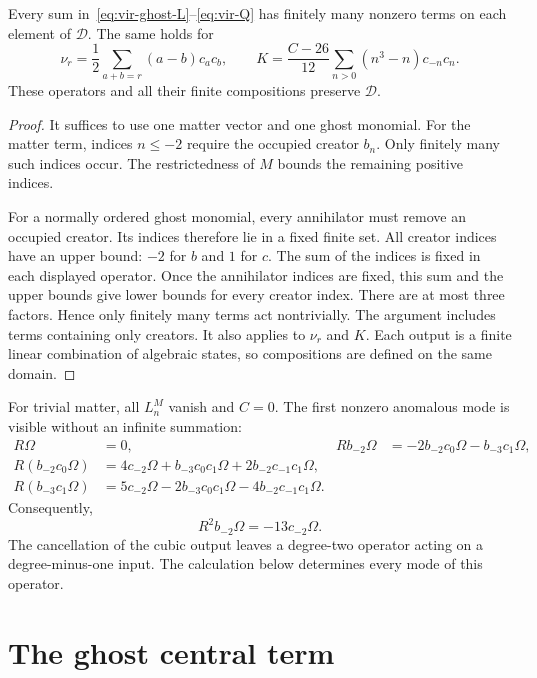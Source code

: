 \begin{lemma}\label{lem:vir-domain}
Every sum in~\eqref{eq:vir-ghost-L}--\eqref{eq:vir-Q} has finitely many nonzero terms on each element of $\mathcal D$.
The same holds for
\[
 \nu_r=\frac12\sum_{a+b=r}(a-b)c_ac_b,
 \qquad
 K=\frac{C-26}{12}\sum_{n>0}(n^3-n)c_{-n}c_n.
\]
These operators and all their finite compositions preserve $\mathcal D$.
\end{lemma}

\begin{proof}
It suffices to use one matter vector and one ghost monomial.
For the matter term, indices $n\leq-2$ require the occupied creator $b_n$.
Only finitely many such indices occur.
The restrictedness of $M$ bounds the remaining positive indices.

For a normally ordered ghost monomial, every annihilator must remove an occupied creator.
Its indices therefore lie in a fixed finite set.
All creator indices have an upper bound: $-2$ for $b$ and $1$ for $c$.
The sum of the indices is fixed in each displayed operator.
Once the annihilator indices are fixed, this sum and the upper bounds give lower bounds for every creator index.
There are at most three factors.
Hence only finitely many terms act nontrivially.
The argument includes terms containing only creators.
It also applies to $\nu_r$ and $K$.
Each output is a finite linear combination of algebraic states, so compositions are defined on the same domain.
\end{proof}

For trivial matter, all $L_n^M$ vanish and $C=0$.
The first nonzero anomalous mode is visible without an infinite summation:
\begin{align*}
 R\Omega&=0, &
 Rb_{-2}\Omega&=-2b_{-2}c_0\Omega-b_{-3}c_1\Omega,\\
 R(b_{-2}c_0\Omega)&=4c_{-2}\Omega+b_{-3}c_0c_1\Omega
       +2b_{-2}c_{-1}c_1\Omega,\\
 R(b_{-3}c_1\Omega)&=5c_{-2}\Omega-2b_{-3}c_0c_1\Omega
       -4b_{-2}c_{-1}c_1\Omega.
\end{align*}
Consequently,
\begin{equation}\label{eq:vir-first-square}
 R^2b_{-2}\Omega=-13c_{-2}\Omega.
\end{equation}
The cancellation of the cubic output leaves a degree-two operator acting on a degree-minus-one input.
The calculation below determines every mode of this operator.

\section{The ghost central term}

